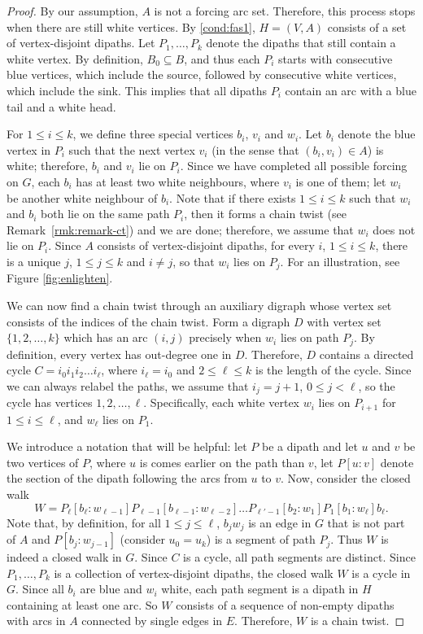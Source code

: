 \documentclass[12pt]{amsart}
\theoremstyle{plain}
\theoremstyle{definition}
\begin{document}
\begin{proof}
By our assumption, $A$ is not a forcing arc set. 
Therefore, this process stops when there are still white vertices. 
By \ref{cond:fas1}, $H=(V, A)$ consists of a set of vertex-disjoint dipaths.  
Let $P_1, \dots, P_k$ denote the dipaths that still contain a white vertex. 
By definition, $B_0\subseteq B$, and thus each $P_i$ starts with consecutive blue vertices, which include the source, followed by consecutive white vertices, which include the sink. 
This implies that all dipaths $P_i$ contain an arc with a blue tail and a white head. 


For $1\leq i\leq k$, we define three special vertices $b_i$, $v_i$ and $w_i$. Let $b_i$ denote the blue vertex in $P_i$ such that the next vertex $v_i$ (in the sense that $(b_i, v_i)\in A$) is white; therefore, $b_i$ and $v_i$ lie on $P_i$. 
Since we have completed all possible forcing on $G$, each $b_i$ has at least two white neighbours, where $v_i$ is one of them; 
let $w_i$ be another white neighbour of $b_i$. 
Note that if there exists $1\leq i\leq k$ such that $w_i$ and $b_i$ both lie on the same path $P_i$, then it forms a chain twist (see Remark~\ref{rmk:remark-ct}) and we are done; therefore, we assume that $w_i$ does not lie on $P_i$. 
Since $A$ consists of vertex-disjoint dipaths, for every $i$, $1\leq i\leq k$, there is a unique $j$, $1\leq j\leq k$ and $i\neq j$, so that $w_i$ lies on $P_j$. For an illustration, see Figure \ref{fig:enlighten}.



We can now find a chain twist through an auxiliary digraph {whose vertex set consists of the indices of the chain twist}. Form a digraph $D$ with vertex set $\{1,2,\dots, k\}$ which has an arc $(i,j)$ precisely when $w_i$ lies on path $P_j$. By definition, every vertex has out-degree one in $D$. Therefore, $D$ contains a directed cycle $C=i_0i_1i_2\dots i_\ell$, where $i_\ell=i_0$ and $2\leq \ell\leq k$ is the length of the cycle. Since we can always relabel the paths, we assume that $i_j=j+1$, $0\leq j<\ell$, so the cycle has vertices $1, 2,\dots, \ell$. 
Specifically, each white vertex $w_i$ lies on $P_{i+1}$ for $1\leq i\leq \ell$, and $w_\ell$ lies on $P_1$.

We introduce a notation that will be helpful: let $P$ be a dipath and let $u$ and $v$ be two vertices of $P$, where $u$ is comes earlier on the path than $v$, let $P[u:v]$ denote the section of the dipath following the arcs from $u$ to $v$. 
Now, consider the closed walk 
$$ W= P_{\ell}[b_{\ell}: w_{\ell-1}]P_{\ell-1}[b_{\ell-1}: w_{\ell-2}]\dots P_{\ell'-1}[b_{2}:w_{1}]P_{1}[b_{1}:w_{\ell}]b_{\ell}. $$
Note that, by definition, for all $1\leq j\leq \ell$, $b_jw_j$ is an edge in $G$ that is not part of $A$ and $P[b_j:w_{j-1}]$ (consider $u_0=u_k$) is a segment of path $P_j$. Thus
$W$ is indeed a closed walk in $G$. Since $C$ is a cycle, all path segments are distinct. Since $P_1, \dots, P_k$ is a collection of vertex-disjoint dipaths, the closed walk $W$ is a cycle in $G$. Since all $b_i$ are blue and $w_i$ white, each path segment is a dipath in $H$ containing at least one arc. So $W$ consists of a sequence of non-empty dipaths with arcs in $A$ connected by single edges in $E$. Therefore, $W$ is a chain twist. 
\end{proof}
\end{document}

